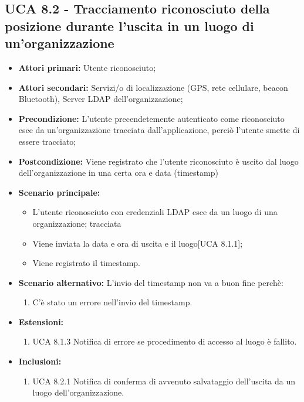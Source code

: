 \subsection{UCA 8.2 - Tracciamento riconosciuto della posizione durante l'uscita in un luogo di un'organizzazione}%
\begin{itemize}
	\item \textbf{Attori primari:} Utente riconosciuto;
	\item \textbf{Attori secondari:} Servizi/o di localizzazione (GPS, rete cellulare, beacon Bluetooth), Server LDAP dell'organizzazione;
	\item \textbf{Precondizione:} L'utente precendetemente autenticato come riconosciuto esce da un'organizzazione tracciata dall'applicazione, perciò l'utente smette di essere tracciato;
	\item \textbf{Postcondizione:} Viene registrato che l'utente riconosciuto è uscito dal luogo dell'organizzazione in una certa ora e data (timestamp)
	\item \textbf{Scenario principale:}
	\begin{itemize}
		\item L'utente riconosciuto con credenziali LDAP esce da un luogo di una organizzazione; tracciata
		\item Viene inviata la data e ora di uscita e il luogo[UCA 8.1.1];
		\item Viene registrato il timestamp.
	\end{itemize}
	\item \textbf{Scenario alternativo:} L'invio del timestamp non va a buon fine perchè:
	\begin{enumerate}
		\item C'è stato un errore nell'invio del timestamp.
	\end{enumerate}
	\item \textbf{Estensioni:}
	\begin{enumerate}
		\item UCA 8.1.3 Notifica di errore se procedimento di accesso al luogo è fallito.
	\end{enumerate}
	\item \textbf{Inclusioni:}
	\begin{enumerate}
		\item UCA 8.2.1 Notifica di conferma di avvenuto salvataggio dell'uscita da un luogo dell'organizzazione.
	\end{enumerate}
\end{itemize}

